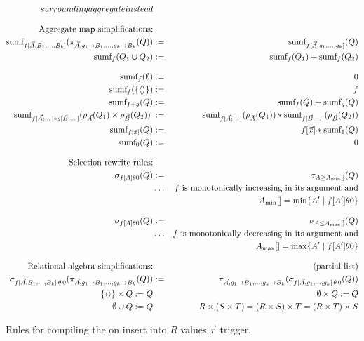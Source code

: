 \begin{figure*}[t!]
\begin{eqnarray}
{surrounding aggregate instead}
\\[2ex]
%
%
\nonumber
\mbox{Aggregate map simplifications:} &&
\\
\label{eq:c1}
\algsumf_{f[\vec{A}, B_1, \dots, B_k]}
   (\pi_{\vec{A}, g_1 \rightarrow B_1, \dots, g_k \rightarrow B_k}(Q))
&:=&
\algsumf_{f[\vec{A}, g_1, \dots, g_k]}(Q)
\\
\label{eq:c3}
\algsumf_f(Q_1 \cup Q_2) &:=& \algsumf_f(Q_1) + \algsumf_f(Q_2)
\\[2ex]
%
%
\label{eq:d1}
\algsumf_f(\emptyset) &:=& 0
\\
\label{eq:d2}
\algsumf_f(\{\tuple{}\}) &:=& f
\\
\label{eq:d3}
\algsumf_{f+g}(Q) &:=& \algsumf_f(Q) + \algsumf_g(Q)
\\
\label{eq:d4}
\algsumf_{f[\vec{A};\dots] * g[\vec{B};\dots]}(\rho_{\vec{A}}(Q_1) \times \rho_{\vec{B}}(Q_2)) \; &:=&
\algsumf_{f[\vec{A};\dots]}(\rho_{\vec{A}}(Q_1))
    * \algsumf_{f[\vec{B};\dots]}(\rho_{\vec{B}}(Q_2))
\\
\label{eq:d5}
\algsumf_{f[\vec{x}]}(Q) &:=& f[\vec{x}] * \algsumf_1(Q)
\\
\label{eq:d6}
\algsumf_{0}(Q) &:=& 0
\\[2ex]
\nonumber \mbox{Selection rewrite rules:} && \\
\label{eq:e1}
\sigma_{f[A] \theta 0}(Q) &:=& \sigma_{A \ge A_{\min}[]}(Q)
\\
&\dots& \mbox{$f$ is monotonically increasing in its argument and}
\nonumber
\\
&& A_{\min}[] = \min \{ A' \mid f[A'] \theta 0 \} 
\nonumber
\\[2ex]
\label{eq:e2}
\sigma_{f[A] \theta 0}(Q) &:=& \sigma_{A \le A_{\max}[]}(Q)
\\
&\dots& \mbox{$f$ is monotonically decreasing in its argument and}
\nonumber
\\
&& A_{\max}[] = \max \{ A' \mid f[A'] \theta 0 \} 
\nonumber
\\[2ex]
%
%
\mbox{Relational algebra simplifications:} &&
\mbox{(partial list)}
\nonumber
\\
\label{eq:f1}
\sigma_{f[\vec{A}, B_1, \dots, B_k] \,\theta\, 0}
   (\pi_{\vec{A}, g_1 \rightarrow B_1, \dots, g_k \rightarrow B_k}(Q))
&:=&
\pi_{\vec{A}, g_1 \rightarrow B_1, \dots, g_k \rightarrow B_k}(
\sigma_{f[\vec{A}, g_1, \dots, g_k] \,\theta\, 0}(Q))
\\
\nonumber
\{\tuple{}\} \times Q := Q &&
\emptyset \times Q := Q
\\
\nonumber
\emptyset \cup Q := Q &&
R \times (S \times T) = (R \times S) \times T = (R \times T) \times S
\end{eqnarray}

\vspace{-4mm}

\caption{Rules for compiling the
on insert into $R$ values $\vec{r}$ trigger.}
\label{fig:mainalg}
\end{figure*}


